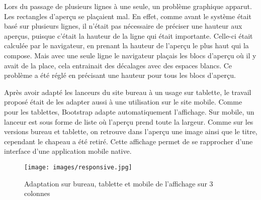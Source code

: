 \documentclass[12pt,a4paper]{article}
\begin{document}
\medskip
Lors du passage de plusieurs lignes à une seule, un problème graphique apparut. Les rectangles d'aperçu se plaçaient mal. En effet, comme avant le système était basé sur plusieurs lignes, il n'était pas nécessaire de préciser une hauteur aux aperçus, puisque c'était la hauteur de la ligne qui était importante. Celle-ci était calculée par le navigateur, en prenant la hauteur de l'aperçu le plus haut qui la compose. Mais avec une seule ligne le navigateur plaçais les blocs d'aperçu où il y avait de la place, cela entrainait des décalages avec des espaces blancs. Ce problème a été réglé en précisant une hauteur pour tous les blocs d'aperçu.\par 
\bigskip
Après avoir adapté les lanceurs du site bureau à un usage sur tablette, le travail proposé était de les adapter aussi à une utilisation sur le site mobile. Comme pour les tablettes, Bootstrap adapte automatiquement l'affichage. Sur mobile, un lanceur est sous forme de liste où l'aperçu prend toute la largeur. Comme sur les versions bureau et tablette, on retrouve dans l'aperçu une image ainsi que le titre, cependant le chapeau a été retiré. Cette affichage permet de se rapprocher d'une interface d'une application mobile native.\par

\begin{figure}[h!]
\centering\texttt{[image: images/responsive.jpg]} 
\caption{Adaptation sur bureau, tablette et mobile de l'affichage sur 3 colonnes}
\end{figure}
\newpage
\end{document}
